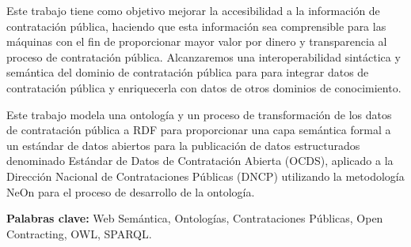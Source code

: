 \begin{resumen}

Este trabajo tiene como objetivo mejorar la accesibilidad a la información de contratación pública, haciendo que esta información sea comprensible para las máquinas con el fin de proporcionar mayor valor por dinero y transparencia al proceso de contratación pública. Alcanzaremos una interoperabilidad sintáctica y semántica del dominio de contratación pública para para integrar datos de contratación pública y enriquecerla con datos de otros dominios de conocimiento.

Este trabajo modela una ontología y un proceso de transformación de los datos de contratación pública a RDF para proporcionar una capa semántica formal a un estándar de datos abiertos para la publicación de datos estructurados denominado Estándar de Datos de Contratación Abierta (OCDS), aplicado a la Dirección Nacional de Contrataciones Públicas (DNCP) utilizando la metodología NeOn para el proceso de desarrollo de la ontología.
    
\textbf{Palabras clave:} Web Semántica,  Ontologías, Contrataciones Públicas, Open Contracting, OWL, SPARQL.
\end{resumen}


